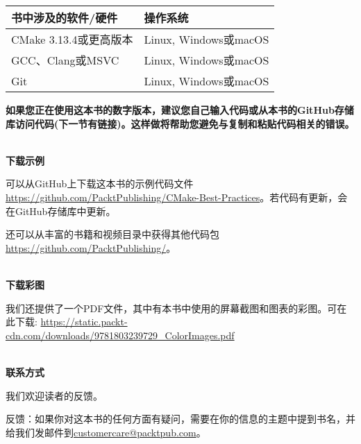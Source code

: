 \begin{table}[H]
	\centering
	\begin{tabular}{|l|l|}
		\hline
		书中涉及的软件/硬件                                                                                                                  & 操作系统                                                             \\ \hline
		CMake 3.13.4或更高版本                                                                                                                                  &                                                                           Linux, Windows或macOS       \\  \hline
		GCC、Clang或MSVC              &                                                                                  Linux, Windows或macOS\\  \hline
		Git  &  Linux, Windows或macOS                                                                                \\ \hline
	\end{tabular}
\end{table}

\textbf{如果您正在使用这本书的数字版本，建议您自己输入代码或从本书的GitHub存储库访问代码(下一节有链接)。这样做将帮助您避免与复制和粘贴代码相关的错误。}

\hspace*{\fill} \\ %
\textbf{下载示例}

可以从GitHub上下载这本书的示例代码文件\url{https://github.com/PacktPublishing/CMake-Best-Practices}。若代码有更新，会在GitHub存储库中更新。

还可以从丰富的书籍和视频目录中获得其他代码包\url{https://github.com/PacktPublishing/}。

\hspace*{\fill} \\ %
\textbf{下载彩图}

我们还提供了一个PDF文件，其中有本书中使用的屏幕截图和图表的彩图。可在此下载: \url{https://static.packt-cdn.com/downloads/9781803239729_ColorImages.pdf}

\hspace*{\fill} \\ %
\textbf{联系方式}

我们欢迎读者的反馈。

反馈：如果你对这本书的任何方面有疑问，需要在你的信息的主题中提到书名，并给我们发邮件到\url{customercare@packtpub.com}。

